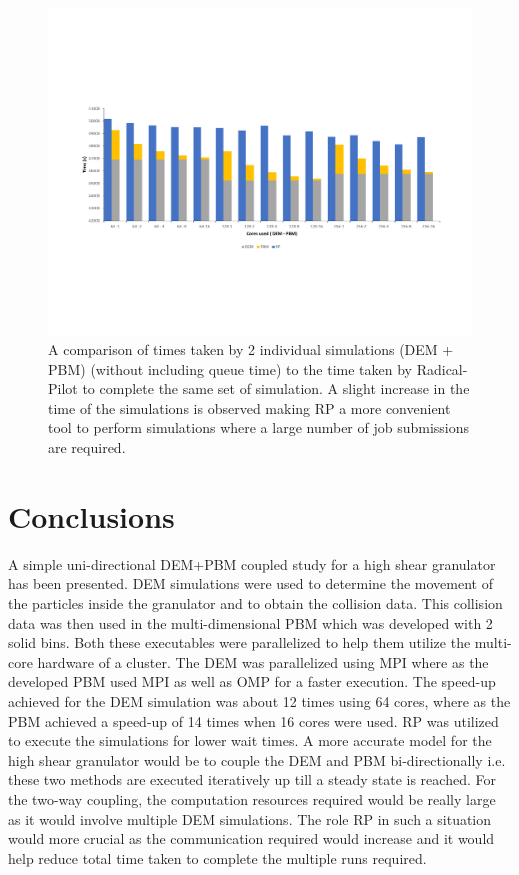 \documentclass[preprint,11pt,authoryear]{elsarticle}
\begin{document}
\begin{figure}
\centering
\includegraphics[scale=0.7]{rslts_RP_timeComparison.pdf}
\caption{A comparison of times taken by 2 individual simulations (DEM + PBM) (without 
including queue time) to the  time taken by Radical-Pilot to complete the same set of simulation. 
A slight increase in the time of the simulations is observed making RP a more convenient 
tool to perform simulations where a large number of job submissions are required.}
\label{fig:rslts_RP_time_plot}
\end{figure}
	    
\section{Conclusions}
 A simple uni-directional DEM+PBM coupled study for a high shear granulator has been presented. DEM simulations were 
used to determine the movement of the particles inside the granulator and to obtain the collision data. This collision data 
was then used in the multi-dimensional PBM which was developed with 2 solid bins. Both these executables were parallelized 
to help them utilize the multi-core hardware of a cluster. The DEM was parallelized using MPI where as the developed PBM used 
MPI as well as OMP for a faster execution. The speed-up achieved for the DEM simulation was about 12 times using 64 cores, 
where as the PBM achieved a speed-up of 14 times when 16 cores were used. RP was utilized to execute the simulations for lower 
wait times.
 A more accurate model for the high shear granulator would be to couple the DEM and PBM bi-directionally i.e. these 
two methods are executed iteratively up till a steady state is reached. For the two-way coupling, the computation resources 
required would be really large as it would involve multiple DEM simulations. The role RP in such a situation would more crucial 
as the communication required would increase and it would help reduce total time taken to complete the multiple runs required. 
\end{document}
